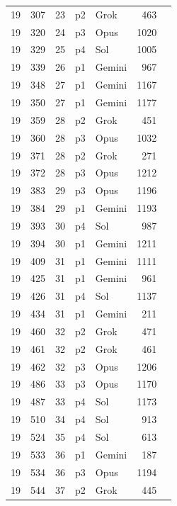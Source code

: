 \begin{longtable}{r r r l l r L{2.2in}}
19 & 307 & 23 & p2 & Grok & 463 &  \\
19 & 320 & 24 & p3 & Opus & 1020 &  \\
19 & 329 & 25 & p4 & Sol & 1005 &  \\
19 & 339 & 26 & p1 & Gemini & 967 &  \\
19 & 348 & 27 & p1 & Gemini & 1167 &  \\
19 & 350 & 27 & p1 & Gemini & 1177 &  \\
19 & 359 & 28 & p2 & Grok & 451 &  \\
19 & 360 & 28 & p3 & Opus & 1032 &  \\
19 & 371 & 28 & p2 & Grok & 271 &  \\
19 & 372 & 28 & p3 & Opus & 1212 &  \\
19 & 383 & 29 & p3 & Opus & 1196 &  \\
19 & 384 & 29 & p1 & Gemini & 1193 &  \\
19 & 393 & 30 & p4 & Sol & 987 &  \\
19 & 394 & 30 & p1 & Gemini & 1211 &  \\
19 & 409 & 31 & p1 & Gemini & 1111 &  \\
19 & 425 & 31 & p1 & Gemini & 961 &  \\
19 & 426 & 31 & p4 & Sol & 1137 &  \\
19 & 434 & 31 & p1 & Gemini & 211 &  \\
19 & 460 & 32 & p2 & Grok & 471 &  \\
19 & 461 & 32 & p2 & Grok & 461 &  \\
19 & 462 & 32 & p3 & Opus & 1206 &  \\
19 & 486 & 33 & p3 & Opus & 1170 &  \\
19 & 487 & 33 & p4 & Sol & 1173 &  \\
19 & 510 & 34 & p4 & Sol & 913 &  \\
19 & 524 & 35 & p4 & Sol & 613 &  \\
19 & 533 & 36 & p1 & Gemini & 187 &  \\
19 & 534 & 36 & p3 & Opus & 1194 &  \\
19 & 544 & 37 & p2 & Grok & 445 &  \\

\end{longtable}
